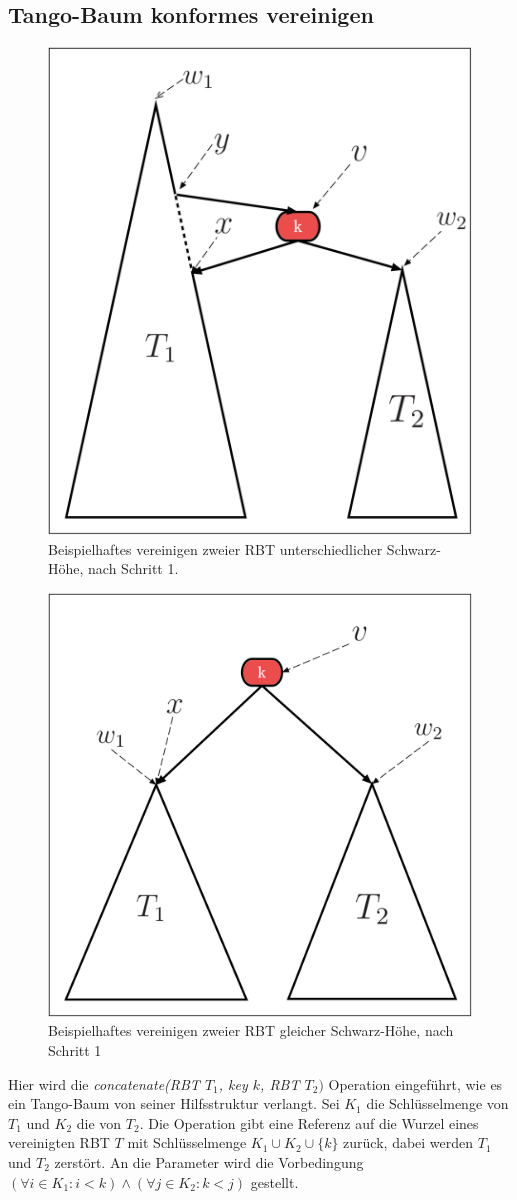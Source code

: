 \documentclass[a4paper,12pt]{article}
\begin{document}
\subsection{Tango-Baum konformes vereinigen} \label{vereinigen}
\begin{figure}[h]
	\centering
	\includegraphics[height= 0.6\textwidth]{"Medien/RotSchwarzBaum/vereinigen"}
	\caption{Beispielhaftes vereinigen zweier RBT unterschiedlicher Schwarz-Höhe, nach Schritt 1. }
	\label{fig:vereinigen}
\end{figure}
\begin{figure}[h]
	\centering
	\includegraphics[height= 0.6\textwidth]{"Medien/RotSchwarzBaum/vereinigen2"}
	\caption{Beispielhaftes vereinigen zweier RBT gleicher Schwarz-Höhe, nach Schritt 1 }
	\label{fig:vereinigen2}
\end{figure}
\noindent Hier wird die \textit{concatenate(RBT $T_1$, key $k$, RBT $T_2)$} Operation eingeführt, wie es ein Tango-Baum von seiner Hilfsstruktur verlangt. Sei $K_1$ die Schlüsselmenge von $T_1$ und $K_2$ die von $T_2$. Die Operation gibt eine Referenz auf die Wurzel eines vereinigten RBT $T$ mit Schlüsselmenge $K_1 \cup K_2 \cup \{k\} $ zurück, dabei werden $T_1$ und $T_2$ zerstört. An die Parameter wird die Vorbedingung $(\forall i \in K_1: i < k ) \land (\forall j \in K_2: k < j )$ gestellt.\\
\end{document}
